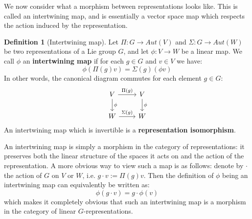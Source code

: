\documentclass[11pt, oneside]{article}   	%
\theoremstyle{definition}
\newtheorem{definition}{Definition}[section]
\begin{document}
We now consider what a morphism between representations looks like. This is called an intertwining map, and 
is essentially a vector space map which respects the action induced by the representation. 

\begin{definition}[Intertwining map]
	Let $\Pi : G\rightarrow Aut(V)$ and $\Sigma : G\rightarrow Aut(W)$ be two representations of a Lie group $G$, 
	and let $\phi : V\rightarrow W$ be a linear map. We call $\phi$ an \textbf{intertwining map} if for each $g\in G$ 
	and $v\in V$ we have:
	\begin{equation}
		\phi(\Pi(g) v) = \Sigma(g) (\phi v)
	\end{equation}
	In other words, the canonical diagram commutes for each element $g\in G$:
	\[\begin{tikzcd}
		V\arrow[r, "\Pi(g)"]\arrow[d, "\phi"] & V\arrow[d, "\phi"] \\
		W\arrow[r, "\Sigma(g)"] & W
	\end{tikzcd}\]
	An intertwining map which is invertible is a \textbf{representation isomorphism}. 
\end{definition}

An intertwining map is simply a morphism in the category of representations: it preserves both the linear 
structure of the spaces it acts on and the action of the representation. A more obvious way to view such a map 
is as follows: denote by $\cdot$ the action of $G$ on $V$ or $W$, i.e. $g\cdot v := \Pi(g)v$. Then the definition of 
$\phi$ being an intertwining map can equivalently be written as:
\begin{equation}
	\phi(g\cdot v) = g\cdot \phi(v)
\end{equation}
which makes it completely obvious that such an intertwining map is a morphism in the category of linear 
$G$-representations. 
\end{document}
